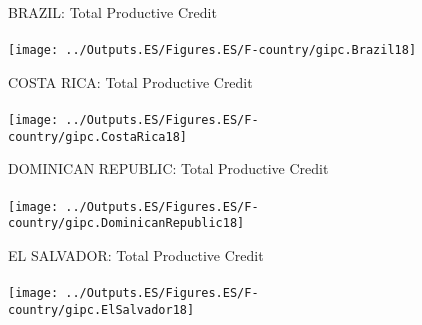\documentclass{beamer}
\begin{document}
%
\begin{frame}
	\begin{figure}
		\centering
		BRAZIL: Total Productive Credit\\~\\
		\texttt{[image: ../Outputs.ES/Figures.ES/F-country/gipc.Brazil18]}
	\end{figure}
\end{frame}
%
%
\begin{frame}
	\begin{figure}
		\centering
		COSTA RICA: Total Productive Credit\\~\\
		\texttt{[image: ../Outputs.ES/Figures.ES/F-country/gipc.CostaRica18]}
	\end{figure}
\end{frame}
%
\begin{frame}
	\begin{figure}
		\centering
		DOMINICAN REPUBLIC: Total Productive Credit\\~\\
		\texttt{[image: ../Outputs.ES/Figures.ES/F-country/gipc.DominicanRepublic18]}
	\end{figure}
\end{frame}

\begin{frame}
\begin{figure}
		\centering
		EL SALVADOR: Total Productive Credit\\~\\
		\texttt{[image: ../Outputs.ES/Figures.ES/F-country/gipc.ElSalvador18]}
	\end{figure}
\end{frame}
\end{document}
